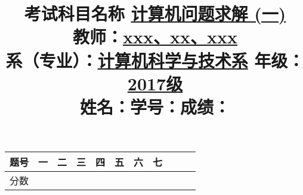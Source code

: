 \documentclass[a4paper, 11pt, UTF8]{ctexart}
\title{\textbf{\song \huge 考试科目名称 \underline{计算机问题求解 (一)}}\\[10pt]
{\LARGE \edate{2018}{01}{18} \hfill 教师：\underline{xxx、xx、xxx} \\
系（专业）：\underline{计算机科学与技术系} \hfill 年级：\underline{2017级} \\[5pt]
姓名：\underline{\hspace{6em}}\hfill 学号：\underline{\hspace{6em}}\hfill 成绩：\underline{\hspace{4em}}}}
\date{\vspace{-5ex}}
\begin{document}
\author{}
\maketitle
\date{\vspace{-8ex}}

\begin{table}[h]
    \centering
    \renewcommand*{\arraystretch}{1.5}
    \begin{tabular}{|C|C|C|C|C|C|C|C|C|C|C|}
        \hline
        题号 &  一 & 二 & 三 & 四 & 五 & 六 & 七 & & &  \\ \hline
        分数 & & & & & & & & & & \\ \hline
    \end{tabular}
\end{table}

\begin{problem}[逻辑推理]
\end{problem}
\end{document}
